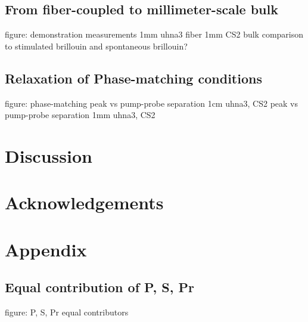   \subsection{From fiber-coupled to millimeter-scale bulk}
  figure: demonstration measurements
    1mm uhna3 fiber
    1mm CS2 bulk
    comparison to stimulated brillouin and spontaneous brillouin?

  \subsection{Relaxation of Phase-matching conditions}
  figure: phase-matching
    peak vs pump-probe separation 1cm uhna3, CS2
    peak vs pump-probe separation 1mm uhna3, CS2

\section{Discussion}

\section{Acknowledgements}

\section{Appendix}
  \subsection{Equal contribution of P, S, Pr}
  figure: P, S, Pr equal contributors
